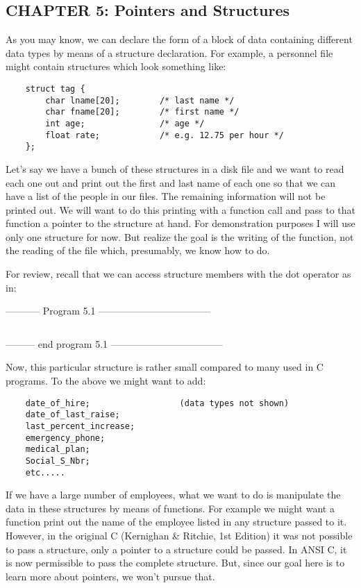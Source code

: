 \hypertarget{chapter-5-pointers-and-structures}{%
\subsection{CHAPTER 5: Pointers and
Structures}\label{chapter-5-pointers-and-structures}}

As you may know, we can declare the form of a block of data containing
different data types by means of a structure declaration. For example, a
personnel file might contain structures which look something like:

\begin{verbatim}
    struct tag {
        char lname[20];        /* last name */
        char fname[20];        /* first name */
        int age;               /* age */
        float rate;            /* e.g. 12.75 per hour */
    };
\end{verbatim}

Let's say we have a bunch of these structures in a disk file and we want
to read each one out and print out the first and last name of each one
so that we can have a list of the people in our files. The remaining
information will not be printed out. We will want to do this printing
with a function call and pass to that function a pointer to the
structure at hand. For demonstration purposes I will use only one
structure for now. But realize the goal is the writing of the function,
not the reading of the file which, presumably, we know how to do.

For review, recall that we can access structure members with the dot
operator as in:

-----------  Program 5.1  -----------------------------------
\inputminted{c}{../src/ch5-1.c}
--------- end program 5.1 -----------------------------------

Now, this particular structure is rather small compared to many used in
C programs. To the above we might want to add:

\begin{verbatim}
    date_of_hire;                  (data types not shown)
    date_of_last_raise;
    last_percent_increase;
    emergency_phone;
    medical_plan;
    Social_S_Nbr;
    etc.....
\end{verbatim}

If we have a large number of employees, what we want to do is manipulate
the data in these structures by means of functions. For example we might
want a function print out the name of the employee listed in any
structure passed to it. However, in the original C (Kernighan \&
Ritchie, 1st Edition) it was not possible to pass a structure, only a
pointer to a structure could be passed. In ANSI C, it is now permissible
to pass the complete structure. But, since our goal here is to learn
more about pointers, we won't pursue that.

